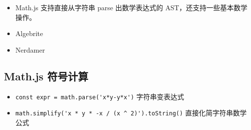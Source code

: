 
\begin{itemize}
\item Math.js 支持直接从字符串 parse 出数学表达式的 AST，还支持一些基本数学操作。
\item Algebrite
\item Nerdamer
\end{itemize}

\subsection{Math.js 符号计算}
\begin{itemize}
\item \verb`const expr = math.parse('x*y-y*x')` 字符串变表达式
\item \verb`math.simplify('x * y * -x / (x ^ 2)').toString()` 直接化简字符串数学公式
\end{itemize}
